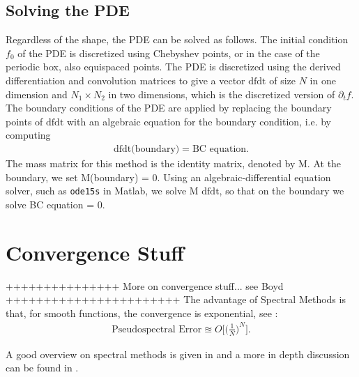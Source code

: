 \documentclass[11pt, a4paper]{article}
\theoremstyle{definition}
\begin{document}
\subsection{Solving the PDE}
Regardless of the shape, the PDE can be solved as follows.
The initial condition $f_0$ of the PDE is discretized using Chebyshev points, or in the case of the periodic box, also equispaced points. The PDE is discretized using the derived differentiation and convolution matrices to give a vector $\text{dfdt}$ of size $N$ in one dimension and $N_1\times N_2$ in two dimensions, which is the discretized version of $\partial_t f$. The boundary conditions of the PDE are applied by replacing the boundary points of $\text{dfdt}$ with an algebraic equation for the boundary condition, i.e. by computing 
\begin{align*}
	\text{dfdt} \text{(boundary)} = \text{BC equation}.
\end{align*}
The mass matrix for this method is the identity matrix, denoted by M. At the boundary, we set M(boundary) = 0. 
Using an algebraic-differential equation solver, such as \texttt{ode15s} in Matlab, we solve M $\text{dfdt}$, so that on the boundary we solve BC equation = 0.
\section{Convergence Stuff}
+++++++++++++++ More on convergence stuff... see Boyd +++++++++++++++++++++++
The advantage of Spectral Methods is that, for smooth functions, the convergence is exponential, see \cite{Boyd1}:
\begin{align*}
	\text{Pseudospectral Error} \approxeq O \bigg[ \bigg( \frac{1}{N} \bigg)^N \bigg].
\end{align*}


A good overview on spectral methods is given in \cite{bibTrefethen} and a more in depth discussion can be found in \cite{Boyd1}.
\end{document}
